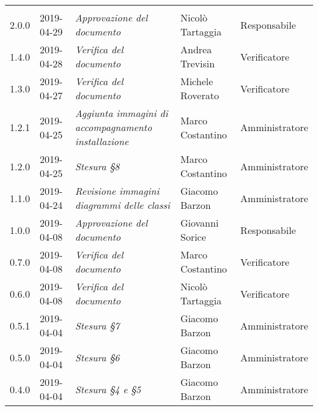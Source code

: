 \newpage 
\section*{}
\begin{longtable}{C{2cm}|C{2.5cm}|C{4.5cm}|C{2.5cm}|C{3cm}}
	
	 &  &  &  &   \\
	\endhead
	
	2.0.0 & 2019-04-29 &  \emph{Approvazione del documento} & Nicolò Tartaggia & Responsabile \\
	\hline
	
	1.4.0 & 2019-04-28 &  \emph{Verifica del documento} & Andrea Trevisin & Verificatore \\
	\hline
	
	1.3.0 & 2019-04-27 &  \emph{Verifica del documento} & Michele Roverato & Verificatore \\
	\hline
	
	1.2.1 & 2019-04-25 &  \emph{Aggiunta immagini di accompagnamento installazione} & Marco Costantino & Amministratore \\
	\hline
	
	1.2.0 & 2019-04-25 &  \emph{Stesura §8} & Marco Costantino & Amministratore \\
	\hline
	
	1.1.0 & 2019-04-24 &  \emph{Revisione immagini diagrammi delle classi} & Giacomo Barzon & Amministratore \\
	\hline
	
	1.0.0 & 2019-04-08 &  \emph{Approvazione del documento} & Giovanni Sorice  & Responsabile\\
	\hline
	
	0.7.0 & 2019-04-08 & \emph{Verifica del documento} & Marco Costantino & Verificatore \\
	\hline
	
	0.6.0 & 2019-04-08 & \emph{Verifica del documento} & Nicolò Tartaggia & Verificatore \\
	\hline
	
	0.5.1 & 2019-04-04 & \emph{Stesura §7} & Giacomo Barzon & Amministratore \\
	\hline
	
	0.5.0 & 2019-04-04 & \emph{Stesura §6} & Giacomo Barzon & Amministratore \\
	\hline
	
	0.4.0 & 2019-04-04 & \emph{Stesura §4 e §5} & Giacomo Barzon & Amministratore \\
	\hline
	

\end{longtable}
